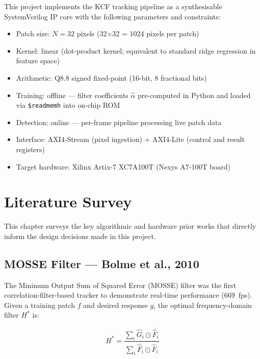 \documentclass[a4paper,12pt]{report}
\begin{document}
This project implements the KCF tracking pipeline as a synthesisable SystemVerilog IP core with the following parameters and constraints:

\begin{itemize}
    \item Patch size: $N = 32$ pixels (32$\times$32 = 1024 pixels per patch)
    \item Kernel: linear (dot-product kernel; equivalent to standard ridge regression in feature space)
    \item Arithmetic: Q8.8 signed fixed-point (16-bit, 8 fractional bits)
    \item Training: offline — filter coefficients $\hat{\alpha}$ pre-computed in Python and loaded via \texttt{\$readmemh} into on-chip ROM
    \item Detection: online — per-frame pipeline processing live patch data
    \item Interface: AXI4-Stream (pixel ingestion) + AXI4-Lite (control and result registers)
    \item Target hardware: Xilinx Artix-7 XC7A100T (Nexys A7-100T board)
\end{itemize}

\chapter{Literature Survey}

This chapter surveys the key algorithmic and hardware prior works that directly inform the design decisions made in this project.

\section{MOSSE Filter --- Bolme et al., 2010}

The Minimum Output Sum of Squared Error (MOSSE) filter \cite{bolme2010} was the first correlation-filter-based tracker to demonstrate real-time performance (669~fps). Given a training patch $f$ and desired response $g$, the optimal frequency-domain filter $H^*$ is:

\begin{equation}
H^* = \frac{\sum_i \hat{G}_i \odot \overline{\hat{F}_i}}{\sum_i \overline{\hat{F}_i} \odot \hat{F}_i}
\end{equation}
\end{document}
